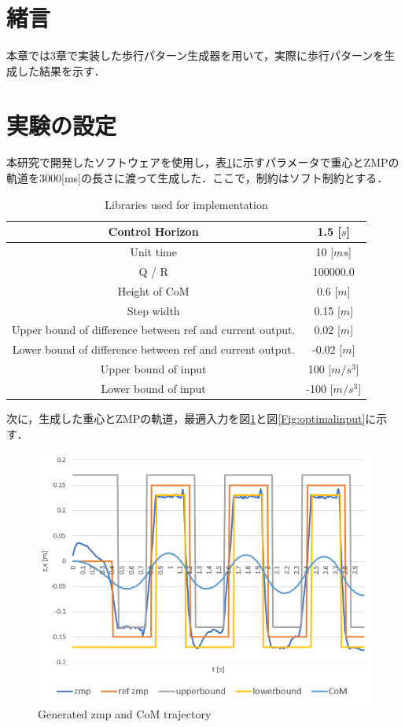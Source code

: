 \section{緒言}
本章では3章で実装した歩行パターン生成器を用いて，実際に歩行パターンを生成した結果を示す．
\section{実験の設定}
本研究で開発したソフトウェアを使用し，表\ref{tb:parametor}に示すパラメータで重心とZMPの軌道を3000[ms]の長さに渡って生成した．ここで，制約はソフト制約とする．

\begin{table}[htbp]
  \centering
  \begin{tabular}{|c|c|} \hline
    Control Horizon & 1.5 [$s$] \\ \hline
    Unit time &10 [$ms$] \\ \hline
    Q / R  & 100000.0 \\ \hline
    Height of CoM & 0.6 [$m$] \\ \hline
    Step width & 0.15 [$m$] \\ \hline
    Upper bound of difference between ref and current output. & 0.02 [$m$] \\ \hline
    Lower bound of difference between ref and current output. & -0.02 [$m$] \\ \hline
    Upper bound of input & 100 [$m/s^{3}$] \\ \hline
    Lower bound of input & -100 [$m/s^{3}$] \\ \hline
  \end{tabular}
  \caption{Libraries used for implementation}
  \label{tb:parametor}
\end{table}

\newpage

次に，生成した重心とZMPの軌道，最適入力を図\ref{Fig:zmptrajectory}と図\ref{Fig:optimalinput}に示す．

\begin{figure}[hbtp]
  \centering
 \includegraphics[keepaspectratio, scale=0.6]
      {images/zmp_trajectory.png}
 \caption{Generated zmp and CoM trajectory }
 \label{Fig:zmptrajectory}
\end{figure}

